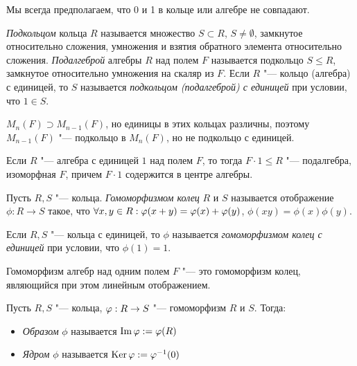 \begin{note}
	Мы всегда предполагаем, что 0 и 1 в кольце или алгебре не совпадают.
\end{note}

\begin{definition}
	\textit{Подкольцом} кольца $R$ называется множество $S \subset R$, $S \ne \emptyset$, замкнутое относительно сложения, умножения и взятия обратного элемента относительно сложения. \textit{Подалгеброй} алгебры $R$ над полем $F$ называется подкольцо $S \le R$, замкнутое относительно умножения на скаляр из $F$. Если $R$ "--- кольцо (алгебра) с единицей, то $S$ называется \textit{подкольцом (подалгеброй) с единицей} при условии, что $1 \in S$.
\end{definition}

\begin{note}
	$M_n(F) \supset M_{n - 1}(F)$, но единицы в этих кольцах различны, поэтому $M_{n-1}(F)$ "--- подкольцо в $M_n(F)$, но не подкольцо с единицей.
\end{note}

\begin{note}
	Если $R$ "--- алгебра с единицей $1$ над полем $F$, то тогда $F \cdot 1 \le R$ "--- подалгебра, изоморфная $F$, причем $F \cdot 1$ содержится в центре алгебры.
\end{note}

\begin{definition}
	Пусть $R, S$ "--- кольца. \textit{Гомоморфизмом колец} $R$ и $S$ называется отображение $\phi: R \to S$ такое, что $\forall x, y \in R: \phi(x + y) \hm= \phi(x) + \phi(y)$, $\phi(xy) = \phi(x)\phi(y)$.
	
	Если $R, S$ "--- кольца с единицей, то $\phi$ называется \textit{гомоморфизмом колец с единицей} при условии, что $\phi(1) = 1$.
\end{definition}

\begin{note}
	Гомоморфизм алгебр над одним полем $F$ "--- это гомоморфизм колец, являющийся при этом линейным отображением.
\end{note}

\begin{definition}
	Пусть $R, S$ "--- кольца, $\phi : R \hm\to S$ "--- гомоморфизм $R$ и $S$. Тогда:
	\begin{itemize}
		\item \textit{Образом} $\phi$ называется $\operatorname{Im}\varphi := \varphi(R)$
		\item \textit{Ядром} $\phi$ называется $\operatorname{Ker}\varphi := \varphi^{-1}(0)$
	\end{itemize}
\end{definition}

